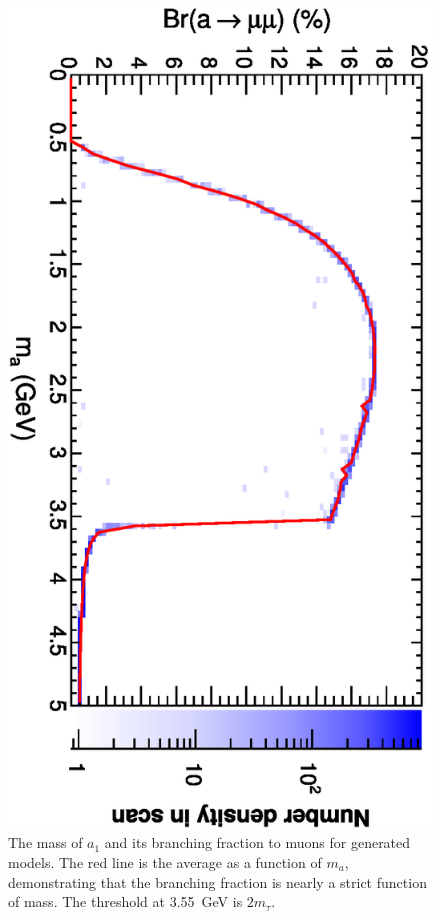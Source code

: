 \documentclass[aps,12pt,superscriptaddress,nofootinbib,floatfix,showpacs]{revtex4}
\begin{document}
\begin{figure}
\includegraphics[height=0.7\linewidth, angle=90]{plots/newbranching/bra_vs_ma.eps}
\caption{The mass of $a_1$ and its branching fraction to muons for
  generated models.  The red line is the average as a function of
  $m_a$, demonstrating that the branching fraction is nearly a strict
  function of mass.  The threshold at 3.55~GeV is
  $2m_\tau$. \label{fig:bramumu}}
\end{figure}



\end{document}
